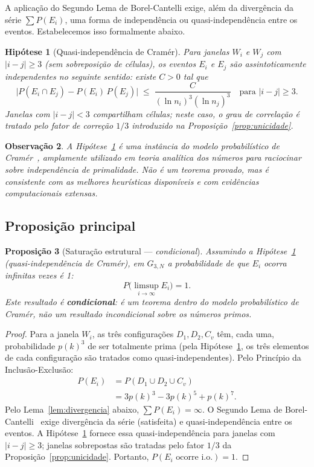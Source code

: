 \documentclass{article}
\newtheorem{proposition}{Proposição}[section]
\newtheorem{remark}[proposition]{Observação}
\newtheorem{assumption}[proposition]{Hipótese}
\begin{document}
	A aplicação do Segundo Lema de Borel-Cantelli exige, além da
	divergência da série $\sum P(E_i)$, uma forma de independência
	ou quasi-independência entre os eventos. Estabelecemos isso
	formalmente abaixo.
	
	\begin{assumption}[Quasi-independência de Cramér]
		\label{hip:cramer}
		Para janelas $W_i$ e $W_j$ com $|i - j| \geq 3$ (sem sobreposição
		de células), os eventos $E_i$ e $E_j$ são assintoticamente
		independentes no seguinte sentido: existe $C > 0$ tal que
		\[
		\bigl|P(E_i \cap E_j) - P(E_i)\,P(E_j)\bigr|
		\;\leq\; \frac{C}{(\ln n_i)^3 (\ln n_j)^3}
		\quad \text{para } |i-j| \geq 3.
		\]
		Janelas com $|i-j| < 3$ compartilham células; neste caso, o
		grau de correlação é tratado pelo fator de correção $1/3$
		introduzido na Proposição~\ref{prop:unicidade}.
	\end{assumption}
	
	\begin{remark}
		A Hipótese~\ref{hip:cramer} é uma instância do modelo probabilístico
		de Cramér~\cite{cramer1936}, amplamente utilizado em teoria analítica
		dos números para raciocinar sobre independência de primalidade.
		Não é um teorema provado, mas é consistente com as melhores heurísticas
		disponíveis e com evidências computacionais extensas.
	\end{remark}
	
	\subsection{Proposição principal}
	
	\begin{proposition}[Saturação estrutural --- \emph{condicional}]
		\label{prop:principal}
		\emph{Assumindo} a Hipótese~\ref{hip:cramer} (quasi-independência
		de Cramér), em $G_{3,N}$ a probabilidade de que $E_i$ ocorra
		infinitas vezes é 1:
		\[
		P\!\bigl(\limsup_{i\to\infty} E_i\bigr) = 1.
		\]
		Este resultado é \textbf{condicional}: é um teorema dentro do
		modelo probabilístico de Cramér, não um resultado incondicional
		sobre os números primos.
	\end{proposition}
	
	\begin{proof}
		Para a janela $W_i$, as três configurações $D_1, D_2, C_v$ têm,
		cada uma, probabilidade $p(k)^3$ de ser totalmente prima
		(pela Hipótese~\ref{hip:cramer}, os três elementos de cada
		configuração são tratados como quasi-independentes). Pelo
		Princípio da Inclusão-Exclusão:
		\begin{align*}
			P(E_i)
			&= P(D_1 \cup D_2 \cup C_v) \\
			&= 3p(k)^3 - 3p(k)^5 + p(k)^7.
		\end{align*}
		Pelo Lema~\ref{lem:divergencia} abaixo, $\sum P(E_i) = \infty$.
		O Segundo Lema de Borel-Cantelli~\cite{durrett2019} exige
		divergência da série (satisfeita) e quasi-independência entre
		os eventos. A Hipótese~\ref{hip:cramer} fornece essa
		quasi-independência para janelas com $|i-j|\geq 3$;
		janelas sobrepostas são tratadas pelo fator $1/3$
		da Proposição~\ref{prop:unicidade}.
		Portanto, $P(E_i \text{ ocorre i.o.}) = 1$.
	\end{proof}
	
\end{document}
